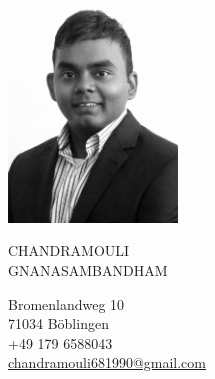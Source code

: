 \documentclass{mycv}
\begin{document}
\sloppy %
\color{templateColor1}
\AddToShipoutPicture{\BackgroundPic}

\normalfont
\begin{minipage}[c]{0.3\textwidth}
	\centering
	\includegraphics[width=4.5cm,height=6cm]{../img/CV_Photo.jpg}
\end{minipage}
\begin{minipage}[]{0.7\textwidth}

  \vspace{5mm}
	{\Huge CHANDRAMOULI}\\

	{\Huge GNANASAMBANDHAM}
	\vspace{2mm}

	\vspace{2mm}

  Bromenlandweg 10\\
	71034 B{\"o}blingen\\

	\telephoneIcon +49 179 6588043\\
	\mailIcon \href{mailto:chandramouli681990@gmail.com}{chandramouli681990@gmail.com}
  
  \vspace{13mm}
\end{minipage}
\end{document}
